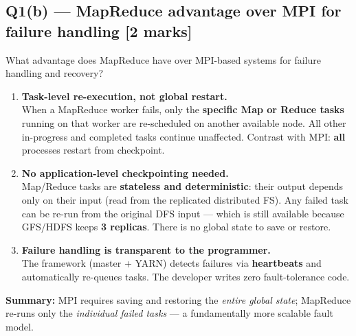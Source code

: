 \documentclass[12pt, a4paper]{article}
\newenvironment{qbox}{\begin{mdframed}[style=qframe]}{\end{mdframed}}
\newenvironment{solbox}{\begin{mdframed}[style=solframe]}{\end{mdframed}}
\newcommand{\qmarks}[1]{\hfill\textbf{\color{orange!70!black}[#1 marks]}}
\begin{document}
\subsection{Q1(b) --- MapReduce advantage over MPI for failure handling
  \texorpdfstring{\qmarks{2}}{}}
\begin{qbox}What advantage does MapReduce have over MPI-based systems for failure handling and
recovery?\end{qbox}
\begin{solbox}
\begin{enumerate}[leftmargin=1.6cm, itemsep=5pt]
  \item \textbf{Task-level re-execution, not global restart.}\\
    When a MapReduce worker fails, only the \textbf{specific Map or Reduce tasks} running on that
    worker are re-scheduled on another available node. All other in-progress and completed tasks
    continue unaffected. Contrast with MPI: \textbf{all} processes restart from checkpoint.

  \item \textbf{No application-level checkpointing needed.}\\
    Map/Reduce tasks are \textbf{stateless and deterministic}: their output depends only on their
    input (read from the replicated distributed FS). Any failed task can be re-run from the
    original DFS input --- which is still available because GFS/HDFS keeps \textbf{3 replicas}.
    There is no global state to save or restore.

  \item \textbf{Failure handling is transparent to the programmer.}\\
    The framework (master + YARN) detects failures via \textbf{heartbeats} and automatically
    re-queues tasks. The developer writes zero fault-tolerance code.
\end{enumerate}

\textbf{Summary:} MPI requires saving and restoring the \textit{entire global state}; MapReduce
re-runs only the \textit{individual failed tasks} --- a fundamentally more scalable fault model.
\end{solbox}

\end{document}

